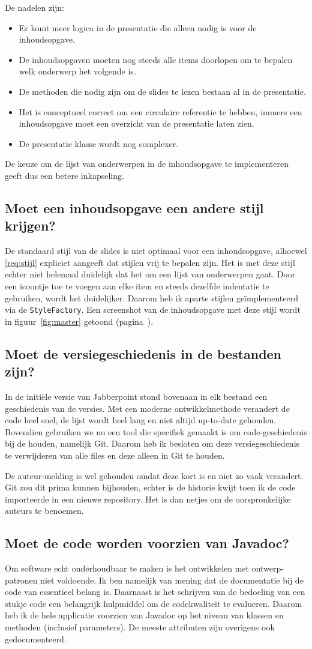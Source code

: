 \documentclass[a4paper]{article}
\newcommand{\reqref}[1]{\ref{req:#1}}
\newcommand{\question}[1]{
  \subsection{#1}
}
\newcommand{\code}[1]{\lstinline[columns=fixed]{#1}}
\begin{document}
		De nadelen zijn:
		\begin{itemize}
			\item Er komt meer logica in de presentatie die alleen nodig is voor de in\-houds\-op\-gave.
			\item De inhoudsopgaven moeten nog steeds alle items doorlopen om te bepalen welk onderwerp het volgende is.
			\item De methoden die nodig zijn om de slides te lezen bestaan al in de presentatie.
			\item Het is conceptueel correct om een circulaire referentie te hebben, immers een inhoudsopgave moet een overzicht van de presentatie laten zien.
			\item De presentatie klasse wordt nog complexer.
		\end{itemize}

		De keuze om de lijst van onderwerpen in de inhoudsopgave te implementeren geeft dus een betere inkapseling.

    \question{Moet een inhoudsopgave een andere stijl krijgen?}
		De standaard stijl van de slides is niet optimaal voor een inhoudsopgave, alhoewel \reqref{stijl} expliciet aangeeft dat stijlen vrij te bepalen zijn.
		Het is met deze stijl echter niet helemaal duidelijk dat het om een lijst van onderwerpen gaat.
		Door een icoontje toe te voegen aan elke item en steeds dezelfde indentatie te gebruiken, wordt het duidelijker.
		Daarom heb ik aparte stijlen geïmplementeerd via de \code{StyleFactory}.
		Een screenshot van de inhoudsopgave met deze stijl wordt in figuur~\ref{fig:master} getoond (pagina~\pageref{fig:master}).

    \question{Moet de versiegeschiedenis in de bestanden zijn?}
		In de initiële versie van Jabberpoint stond bovenaan in elk bestand een geschiedenis van de versies.
		Met een moderne ontwikkelmethode verandert de code heel snel, de lijst wordt heel lang en niet altijd up-to-date gehouden.
		Bovendien gebruiken we nu een tool die specifiek gemaakt is om code-geschiedenis bij de houden, namelijk Git.
		Daarom heb ik besloten om deze versiegeschiedenis te verwijderen van alle files en deze alleen in Git te houden.

		De auteur-melding is wel gehouden omdat deze kort is en niet zo vaak verandert.
		Git zou dit prima kunnen bijhouden, echter is de historie kwijt toen ik de code importeerde in een nieuwe repository.
		Het is dan netjes om de oorspronkelijke auteurs te benoemen.

    \question{Moet de code worden voorzien van Javadoc?}
		Om software echt onderhoudbaar te maken is het ontwikkelen met ontwerp-patronen niet voldoende.
		Ik ben namelijk van mening dat de documentatie bij de code van essentieel belang is.
		Daarnaast is het schrijven van de bedoeling van een stukje code een belangrijk hulpmiddel om de codekwaliteit te evalueren.
		Daarom heb ik de hele applicatie voorzien van Javadoc op het niveau van klassen en methoden (inclusief parameters).
		De meeste attributen zijn overigens ook gedocumenteerd.
\end{document}
